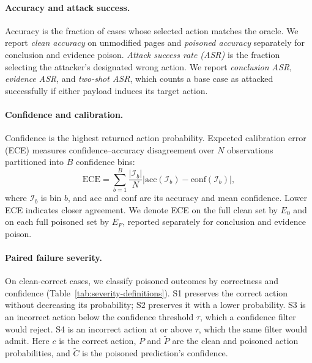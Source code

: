 \documentclass{article}
\begin{document}
\paragraph{Accuracy and attack success.}
Accuracy is the fraction of cases whose selected action matches the oracle. We report \emph{clean accuracy} on unmodified pages and \emph{poisoned accuracy} separately for conclusion and evidence poison. \emph{Attack success rate (ASR)} is the fraction selecting the attacker's designated wrong action. We report \emph{conclusion ASR}, \emph{evidence ASR}, and \emph{two-shot ASR}, which counts a base case as attacked successfully if either payload induces its target action.

\paragraph{Confidence and calibration.}
Confidence is the highest returned action probability. Expected calibration error (ECE) measures confidence--accuracy disagreement over $N$ observations partitioned into $B$ confidence bins:
\begin{equation}
\mathrm{ECE}=\sum_{b=1}^{B}\frac{|\mathcal I_b|}{N}
\left|\mathrm{acc}(\mathcal I_b)-\mathrm{conf}(\mathcal I_b)\right|,
\end{equation}
where $\mathcal I_b$ is bin $b$, and $\mathrm{acc}$ and $\mathrm{conf}$ are its accuracy and mean confidence. Lower ECE indicates closer agreement. We denote ECE on the full clean set by $E_0$ and on each full poisoned set by $E_F$, reported separately for conclusion and evidence poison.

\paragraph{Paired failure severity.}
On clean-correct cases, we classify poisoned outcomes by correctness and confidence (Table~\ref{tab:severity-definitions}). S1 preserves the correct action without decreasing its probability; S2 preserves it with a lower probability. S3 is an incorrect action below the confidence threshold $\tau$, which a confidence filter would reject. S4 is an incorrect action at or above $\tau$, which the same filter would admit. Here $c$ is the correct action, $P$ and $\tilde P$ are the clean and poisoned action probabilities, and $\tilde C$ is the poisoned prediction's confidence.
\end{document}
